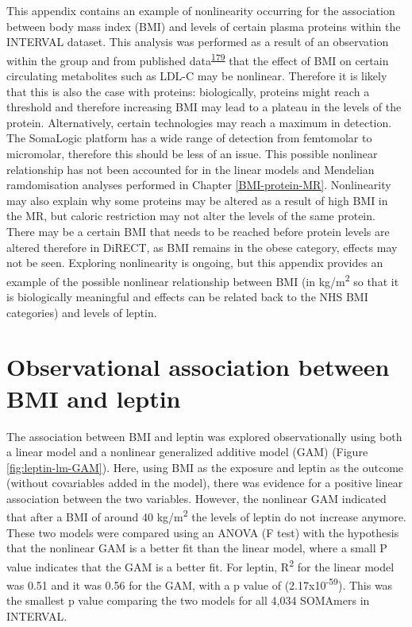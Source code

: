 \documentclass[11pt,twoside]{bristolthesis}
\begin{document}
This appendix contains an example of nonlinearity occurring for the association between body mass index (BMI) and levels of certain plasma proteins within the INTERVAL dataset. This analysis was performed as a result of an observation within the group and from published data\textsuperscript{\protect\hyperlink{ref-Li2021}{179}} that the effect of BMI on certain circulating metabolites such as LDL-C may be nonlinear. Therefore it is likely that this is also the case with proteins: biologically, proteins might reach a threshold and therefore increasing BMI may lead to a plateau in the levels of the protein. Alternatively, certain technologies may reach a maximum in detection. The SomaLogic platform has a wide range of detection from femtomolar to micromolar, therefore this should be less of an issue. This possible nonlinear relationship has not been accounted for in the linear models and Mendelian ramdomisation analyses performed in Chapter \ref{BMI-protein-MR}. Nonlinearity may also explain why some proteins may be altered as a result of high BMI in the MR, but caloric restriction may not alter the levels of the same protein. There may be a certain BMI that needs to be reached before protein levels are altered therefore in DiRECT, as BMI remains in the obese category, effects may not be seen. Exploring nonlinearity is ongoing, but this appendix provides an example of the possible nonlinear relationship between BMI (in kg/m\textsuperscript{2} so that it is biologically meaningful and effects can be related back to the NHS BMI categories) and levels of leptin.

\hypertarget{observational-association-between-bmi-and-leptin}{%
\section{Observational association between BMI and leptin}\label{observational-association-between-bmi-and-leptin}}

The association between BMI and leptin was explored observationally using both a linear model and a nonlinear generalized additive model (GAM) (Figure \ref{fig:leptin-lm-GAM}). Here, using BMI as the exposure and leptin as the outcome (without covariables added in the model), there was evidence for a positive linear association between the two variables. However, the nonlinear GAM indicated that after a BMI of around 40 kg/m\textsuperscript{2} the levels of leptin do not increase anymore. These two models were compared using an ANOVA (F test) with the hypothesis that the nonlinear GAM is a better fit than the linear model, where a small P value indicates that the GAM is a better fit. For leptin, R\textsuperscript{2} for the linear model was 0.51 and it was 0.56 for the GAM, with a p value of (2.17x10\textsuperscript{-59}). This was the smallest p value comparing the two models for all 4,034 SOMAmers in INTERVAL.
\end{document}
